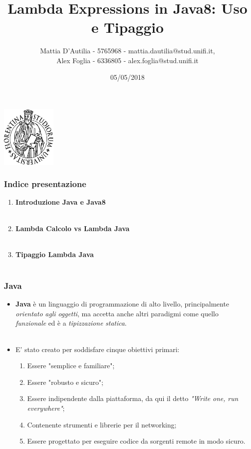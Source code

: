 \documentclass{beamer}
\title[Lambda in Java8]{Lambda Expressions in Java8: Uso e Tipaggio}
\author[]{Mattia D'Autilia - 5765968 - mattia.dautilia@stud.unifi.it,\\ Alex Foglia - 6336805 - alex.foglia@stud.unifi.it}
\date{05/05/2018}
\begin{document}
\begin{frame}
	\begin{center}
  		\includegraphics[width=0.2\textwidth]{assets/logo-unifi.png}
  	\end{center}
	\titlepage 
\end{frame}

\begin{frame}
	\frametitle{Indice presentazione}
	\begin{enumerate}
		\item
			\textbf{Introduzione Java e Java8}\\\
		\item
			\textbf{Lambda Calcolo vs Lambda Java}\\\
		\item
			\textbf{Tipaggio Lambda Java}\\\
	\end{enumerate}
\end{frame}


\begin{frame}
	\frametitle{Java}
	\begin{itemize}
		\item
			\textbf{Java} è un linguaggio di programmazione di alto livello, principalmente \textit{orientato agli oggetti}, ma accetta anche altri paradigmi come quello \textit{funzionale} ed è a \textit{tipizzazione statica}.\\\
		\item
			E' stato creato per soddisfare cinque obiettivi primari:
			\begin{enumerate}
				\item
					Essere "semplice e familiare";
				\item
					Essere "robusto e sicuro";
				\item
					Essere indipendente dalla piattaforma, da qui il detto \textit{"Write one, run everywhere"};
				\item
					Contenente strumenti e librerie per il networking;
				\item
					Essere progettato per eseguire codice da sorgenti remote in modo sicuro.
			\end{enumerate}
	\end{itemize}
\end{frame}
\end{document}
